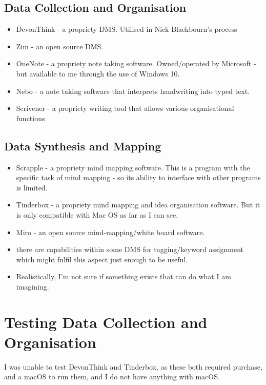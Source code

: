 \documentclass{article}
\begin{document}
\subsection{Data Collection and Organisation}

\begin{itemize}
    \item DevonThink - a propriety DMS. Utilised in Nick Blackbourn's process
    \item Zim - an open source DMS.
    \item OneNote - a propriety note taking software. Owned/operated by Microsoft - but available to me through the use of Windows 10. 
    \item Nebo - a note taking software that interprets handwriting into typed text.
    \item Scrivener - a propriety writing tool that allows various organisational functions
\end{itemize}


\subsection{Data Synthesis and Mapping}

\begin{itemize}
    \item Scrapple - a propriety mind mapping software. This is a program with the specific task of mind mapping - so its ability to interface with other programs is limited.
    \item Tinderbox - a propriety mind mapping and idea organisation software. But it is only compatible with Mac OS as far as I can see.
    \item Miro - an open source mind-mapping/white board software.
    \item there are capabilities within some DMS for tagging/keyword assignment which might fulfil this aspect just enough to be useful.
    \item  Realistically, I'm not sure if something exists that can do what I am imagining. 
\end{itemize}


\section{Testing Data Collection and Organisation}

I was unable to test DevonThink and Tinderbox, as these both required purchase, and a macOS to run them, and I do not have anything with macOS.
\end{document}
